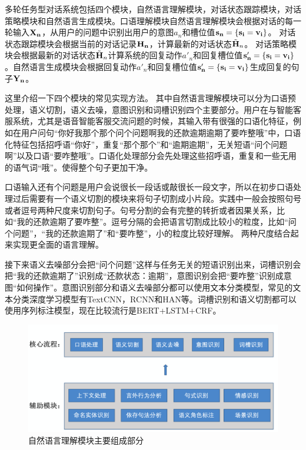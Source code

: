 多轮任务型对话系统包括四个模块，自然语言理解模块，对话状态跟踪模块，对话策略模块和自然语言生成模块。口语理解模块自然语言理解模块会根据对话的每一轮输入$\bf{X}_n$，从用户的问题中识别出用户的意图$a_n$和槽位值$\bf{s}_n=\{s_i=v_i\}$。
对话状态跟踪模块会根据当前的对话记录$\bf{H}_n$，计算最新的对话状态$\tilde{\bf{H}}_n$。 对话策略模块会根据最新的对话状态$\tilde{\bf{H}}_n$计算系统的回复动作$a'_n$和回复槽位值$\bf{s}'_n=\{s_i=v_i\}$。自然语言生成模块会根据回复动作$a'_n$和回复槽位值$\bf{s}'_n=\{s_i=v_i\}$生成回复的句子$\bf{Y}_n$。

这里介绍一下四个模块的常见实现方法。
其中自然语言理解模块可以分为口语预处理，语义切割，语义去噪，意图识别和词槽识别四个主要部分。用户在与智能客服系统，尤其是语音智能客服交流问题的时候，其输入带有很强的口语化特征，例如在用户问句“你好我那个那个问个问题啊我的还款逾期逾期了要咋整哦”中，口语化特征包括招呼语“你好”，重复“那个那个”和“逾期逾期”，无关短语“问个问题啊”以及口语“要咋整哦”。口语化处理部分会先处理这些招呼语，重复和一些无用的语气词“哦”。使得整个句子更加干净。

口语输入还有个问题是用户会说很长一段话或敲很长一段文字，所以在初步口语处理过后需要有一个语义切割的模块来将句子切割成小片段。实践中一般会按照句号或者逗号两种尺度来切割句子。句号分割的会有完整的转折或者因果关系，比如“我的还款逾期了要咋整”。逗号分隔的会把语言切割成比较小的粒度，比如“问个问题”，“我的还款逾期了”和“要咋整”，小的粒度比较好理解。 两种尺度结合起来实现更全面的语言理解。

接下来语义去噪部分会把“问个问题”这样与任务无关的短语识别出来，词槽识别会把“我的还款逾期了”识别成“还款状态：逾期”，意图识别会把“要咋整”识别成意图“如何操作”。意图识别部分和语义去噪部分都可以使用文本分类模型，常见的文本分类深度学习模型有TextCNN\cite{kim-2014-convolutional}，RCNN\cite{lai2015recurrent}和HAN\cite{yang2016hierarchical}等。词槽识别和语义切割都可以使用序列标注模型，现在比较流行是BERT+LSTM+CRF。

\begin{figure}[H]
\centering
\includegraphics[scale=0.25]{chapters/nlu_process.png}
\caption{自然语言理解模块主要组成部分}
\label{fig:parserexample}
\end{figure}

